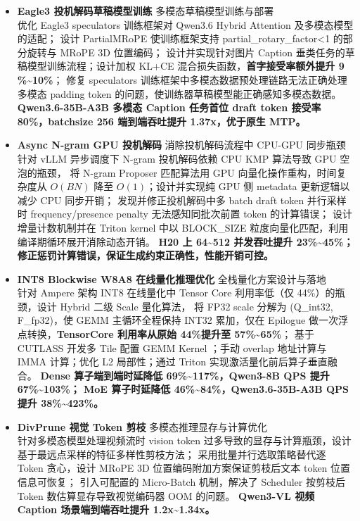 \documentclass{resume}
\begin{document}
\begin{itemize}[parsep=0.2ex]
    \item \textbf{Eagle3 投机解码草稿模型训练} \textbar{} 多模态草稿模型训练与部署 \\
  优化 Eagle3 speculators 训练框架对 Qwen3.6 Hybrid Attention 及多模态模型的适配；
  设计 PartialMRoPE 使训练框架支持 partial\_rotary\_factor<1 的部分旋转与 MRoPE 3D 位置编码；
  设计并实现针对图片 Caption 垂类任务的草稿模型训练流程；设计加权 KL+CE 混合损失函数，\textbf{首字接受率额外提升 9 \%\textasciitilde10\%}；
  修复 speculators 训练框架中多模态数据预处理链路无法正确处理多模态 padding token 的问题，使训练器草稿模型能正确感知多模态数据。
  \textbf{Qwen3.6-35B-A3B 多模态 Caption 任务首位 draft token 接受率 80\%，batchsize 256 端到端吞吐提升 1.37x，优于原生 MTP。}

  \item \textbf{Async N-gram GPU 投机解码} \textbar{} 消除投机解码流程中 CPU-GPU 同步瓶颈 \\
  针对 vLLM 异步调度下 N-gram 投机解码依赖 CPU KMP 算法导致 GPU 空泡的瓶颈，
  将 N-gram Proposer 匹配算法用 GPU 向量化操作重构，时间复杂度从 $O(BN)$ 降至 $O(1)$；设计并实现纯 GPU 侧 metadata 更新逻辑以减少 CPU 同步开销；
  发现并修正投机解码中多 batch draft token 并行采样时 frequency/presence penalty 无法感知同批次前置 token 的计算错误；
  设计增量计数机制并在 Triton kernel 中以 BLOCK\_SIZE 粒度向量化匹配，利用编译期循环展开消除动态开销。
  \textbf{H20 上 64\textasciitilde512 并发吞吐提升 23\%\textasciitilde45\%；修正惩罚计算错误，保证生成约束正确性，性能开销可控。}

  \item \textbf{INT8 Blockwise W8A8 在线量化推理优化} \textbar{} 全栈量化方案设计与落地 \\
  针对 Ampere 架构 INT8 在线量化中 Tensor Core 利用率低（仅 44\%）的瓶颈，设计 Hybrid 二级 Scale 量化算法，
  将 FP32 scale 分解为 (Q\_int32, F\_fp32)，使 GEMM 主循环全程保持 INT32 累加，仅在 Epilogue 做一次浮点转换，\textbf{TensorCore 利用率从原始 44\%提升至 57\%\textasciitilde65\%}；
  基于 CUTLASS 开发多 Tile 配置 GEMM Kernel ；手动 overlap 地址计算与 IMMA 计算；优化 L2 局部性；通过 Triton 实现激活量化前后算子垂直融合。
  \textbf{Dense 算子端到端时延降低 69\%\textasciitilde117\%，Qwen3-8B QPS 提升 67\%\textasciitilde103\%；
  MoE 算子时延降低 46\%\textasciitilde84\%，Qwen3.6-35B-A3B QPS 提升 38\%\textasciitilde423\%。}

  \item \textbf{DivPrune 视觉 Token 剪枝} \textbar{} 多模态推理显存与计算优化 \\
  针对多模态模型处理视频流时 vision token 过多导致的显存与计算瓶颈，设计基于最远点采样的特征多样性剪枝方法；
  采用批量并行选取策略替代逐 Token 贪心，设计 MRoPE 3D 位置编码附加方案保证剪枝后文本 token 位置信息可恢复；
  引入可配置的 Micro-Batch 机制，解决了 Scheduler 按剪枝后 Token 数估算显存导致视觉编码器 OOM 的问题。
  \textbf{Qwen3-VL 视频 Caption 场景端到端吞吐提升 1.2x\textasciitilde1.34x。}


\end{itemize}
\end{document}
